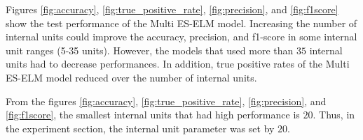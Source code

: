 Figures \ref{fig:accuracy}, \ref{fig:true_positive_rate}, \ref{fig:precision}, and \ref{fig:f1score} show the test performance of the Multi ES-ELM model. Increasing the number of internal units could improve the accuracy, precision, and f1-score in some internal unit ranges (5-35 units). However, the models that used more than $35$ internal units had to decrease performances. In addition, true positive rates of the Multi ES-ELM model reduced over the number of internal units.

From the figures \ref{fig:accuracy}, \ref{fig:true_positive_rate}, \ref{fig:precision}, and \ref{fig:f1score}, the smallest internal units that had high performance is $20$. Thus, in the experiment section, the internal unit parameter was set by $20$.









